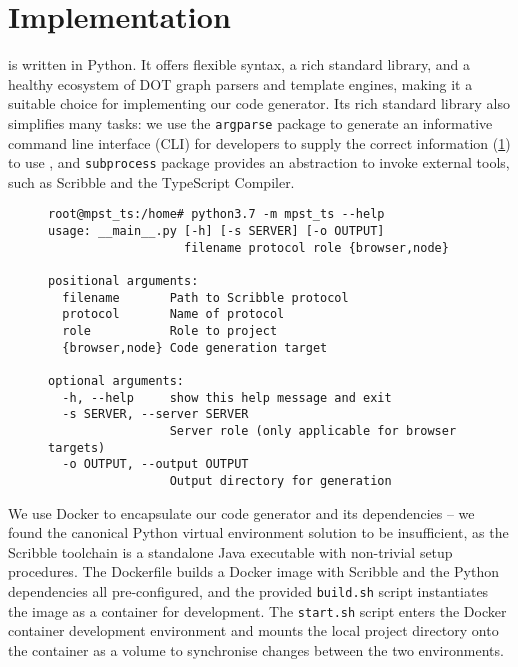 \section{Implementation}

 is written in Python. 
It offers flexible syntax, a rich standard library, and 
a healthy ecosystem of DOT graph parsers and template engines,
making it a suitable choice for implementing our code generator.
Its rich standard library also simplifies many tasks: we use
the \texttt{argparse} package to generate an informative
command line interface (CLI) for developers to 
supply the correct information (\cref{lst:cmdline})
to use ,
and \texttt{subprocess} package provides an abstraction to
invoke external tools, such as Scribble and the TypeScript Compiler.

\begin{figure}[!ht]
\begin{lstlisting}
root@mpst_ts:/home# python3.7 -m mpst_ts --help
usage: __main__.py [-h] [-s SERVER] [-o OUTPUT]
                   filename protocol role {browser,node}

positional arguments:
  filename       Path to Scribble protocol
  protocol       Name of protocol
  role           Role to project
  {browser,node} Code generation target

optional arguments:
  -h, --help     show this help message and exit
  -s SERVER, --server SERVER
                 Server role (only applicable for browser targets)
  -o OUTPUT, --output OUTPUT
                 Output directory for generation
\end{lstlisting}
\label{lst:cmdline}
\end{figure}

We use Docker \cite{docker} to encapsulate our code generator
and its dependencies -- we found the canonical Python virtual environment
solution to be insufficient, as the Scribble toolchain is
a standalone Java executable with non-trivial setup procedures.
The Dockerfile builds a Docker image with Scribble and
the Python dependencies all pre-configured, and the provided
\texttt{build.sh} script instantiates the image as a container 
for development.
The \texttt{start.sh} script enters the Docker container
development environment and mounts the local project directory
onto the container as a volume to synchronise changes between the
two environments.